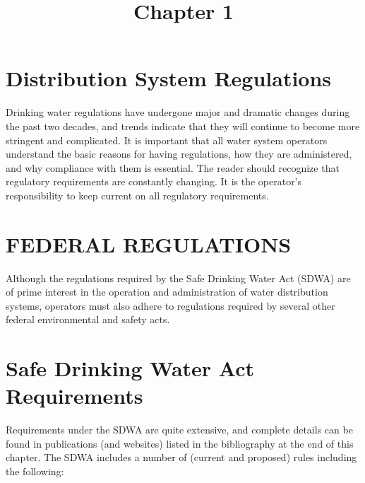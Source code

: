 \documentclass[10pt]{article}
\title{Chapter 1 }
\author{}
\date{}
\begin{document}
\maketitle
\section{Distribution System Regulations}
Drinking water regulations have undergone major and dramatic changes during the past two decades, and trends indicate that they will continue to become more stringent and complicated. It is important that all water system operators understand the basic reasons for having regulations, how they are administered, and why compliance with them is essential. The reader should recognize that regulatory requirements are constantly changing. It is the operator's responsibility to keep current on all regulatory requirements.

\section{FEDERAL REGULATIONS}
Although the regulations required by the Safe Drinking Water Act (SDWA) are of prime interest in the operation and administration of water distribution systems, operators must also adhere to regulations required by several other federal environmental and safety acts.

\section{Safe Drinking Water Act Requirements}
Requirements under the SDWA are quite extensive, and complete details can be found in publications (and websites) listed in the bibliography at the end of this chapter. The SDWA includes a number of (current and proposed) rules including the following:
\end{document}
